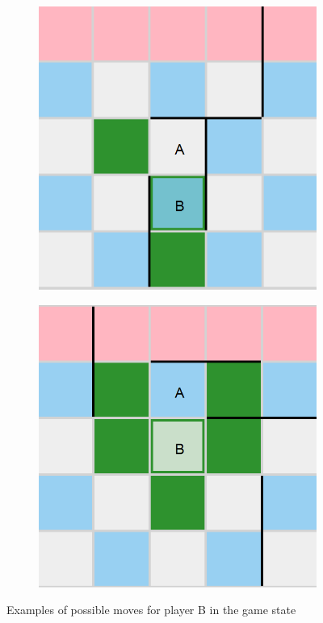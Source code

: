\begin{figure}[h]
\begin{subfigure}{0.2\textwidth}
    \end{subfigure}
    \hfill
    \begin{subfigure}{0.2\textwidth}
        \includegraphics[width=\textwidth]{../img/GameBoard/move03.png}
    \end{subfigure}
    \hfill
    \begin{subfigure}{0.2\textwidth}
        \includegraphics[width=\textwidth]{../img/GameBoard/move04.png}
    \end{subfigure}
    \caption{Examples of possible moves for player B in the game state}
    \label{fig:PossibleMoves}
\end{figure}